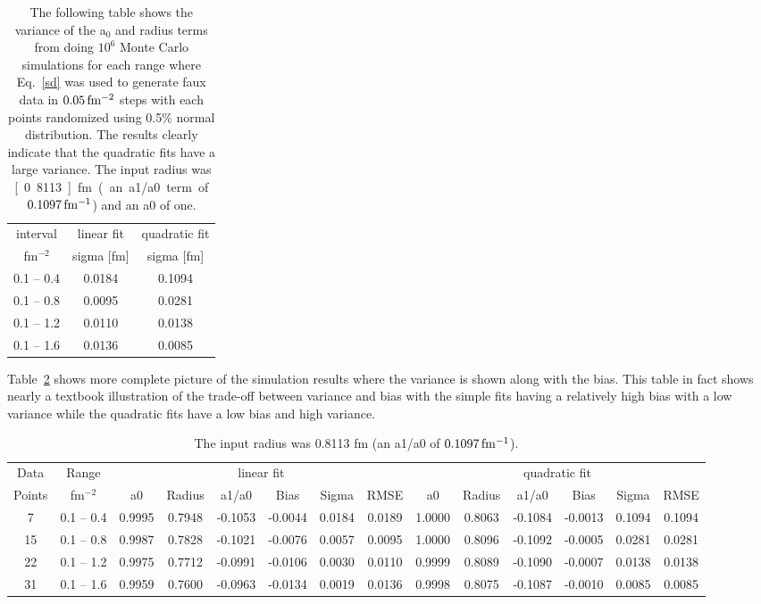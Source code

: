 \documentclass[10pt,aps,prc,twocolumn]{revtex4-1}
\begin{document}
\begin{table}
\label{ztable}
\caption{The following table shows the variance of the a$_0$ and radius terms from doing $10^6$ Monte Carlo simulations
for each range
where Eq.~\ref{sd} was used to generate faux data in $\unit[0.05]{fm^{-2}}$ steps with each points randomized using
0.5\% normal distribution.   The results clearly indicate that the quadratic fits have a large variance.   The input
radius was \unit[0.8113]{fm} (an a1/a0 term of $\unit[0.1097]{fm^{-1}}$) and an a0 of one.}
\begin{tabular}{c|c|c} \hline
interval       & \multicolumn{1}{c|}{linear fit} & \multicolumn{1}{c}{quadratic fit}  \\
fm$^{-2}$   & sigma [fm]         &  sigma [fm] \\ \hline
 0.1 -- 0.4 & 0.0184&  0.1094 \\
 0.1 -- 0.8 & 0.0095&  0.0281 \\
 0.1 -- 1.2 & 0.0110&  0.0138 \\
 0.1 -- 1.6 & 0.0136&  0.0085 \\ \hline
\end{tabular}
\end{table}


Table~\ref{fulltable} shows more complete picture of the simulation results where the variance is shown along with the bias.
This table in fact shows nearly a textbook illustration of the trade-off between variance and bias with the simple fits
having a relatively high bias with a low variance while the quadratic fits have a low bias and high variance.

\begin{table}
\label{fulltable}
\caption{The input radius was 0.8113 fm (an a1/a0 of $\unit[0.1097]{fm^{-1}}$).}
\begin{tabular}{cc|cccccc|cccccc} \hline
Data   & Range     & \multicolumn{6}{c|}{linear fit}                       & \multicolumn{6}{c}{quadratic fit}                    \\ 
Points & fm$^{-2}$ &   a0  & Radius&  a1/a0 &  Bias  & Sigma &  RMSE  &   a0  & Radius& a1/a0  &  Bias  & Sigma &  RMSE \\  \hline
7      & 0.1 -- 0.4 & 0.9995& 0.7948& -0.1053& -0.0044& 0.0184& 0.0189 & 1.0000& 0.8063& -0.1084& -0.0013& 0.1094& 0.1094\\
15     & 0.1 -- 0.8 & 0.9987& 0.7828& -0.1021& -0.0076& 0.0057& 0.0095 & 1.0000& 0.8096& -0.1092& -0.0005& 0.0281& 0.0281\\
22     & 0.1 -- 1.2 & 0.9975& 0.7712& -0.0991& -0.0106& 0.0030& 0.0110 & 0.9999& 0.8089& -0.1090& -0.0007& 0.0138& 0.0138\\
31     & 0.1 -- 1.6 & 0.9959& 0.7600& -0.0963& -0.0134& 0.0019& 0.0136 & 0.9998& 0.8075& -0.1087& -0.0010& 0.0085& 0.0085\\ \hline
\end{tabular}
\end{table}
\end{document}
